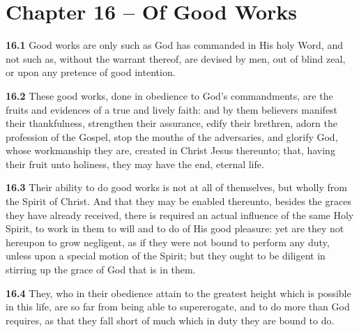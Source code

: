 \section{Chapter 16 -- Of Good Works}

\par\textbf{16.1} Good works are only such as God has commanded in His holy Word, and not such as, without the warrant thereof, are devised by men, out of blind zeal, or upon any pretence of good intention.    

\par\textbf{16.2} These good works, done in obedience to God's commandments, are the fruits and evidences of a true and lively faith: and by them believers manifest their thankfulness, strengthen their assurance, edify their brethren, adorn the profession of the Gospel, stop the mouths of the adversaries, and glorify God, whose workmanship they are, created in Christ Jesus thereunto; that, having their fruit unto holiness, they may have the end, eternal life.   

\par\textbf{16.3} Their ability to do good works is not at all of themselves, but wholly from the Spirit of Christ. And that they may be enabled thereunto, besides the graces they have already received, there is required an actual influence of the same Holy Spirit, to work in them to will and to do of His good pleasure: yet are they not hereupon to grow negligent, as if they were not bound to perform any duty, unless upon a special motion of the Spirit; but they ought to be diligent in stirring up the grace of God that is in them.   

\par\textbf{16.4} They, who in their obedience attain to the greatest height which is possible in this life, are so far from being able to supererogate, and to do more than God requires, as that they fall short of much which in duty they are bound to do.   

